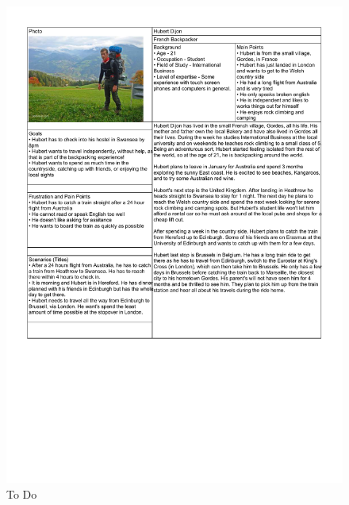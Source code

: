 \begin{figure}[h]
	\centering
	\includegraphics[scale=.8, angle=0, origin=c]{images/personaHubert}
	\caption{To Do}
	\label{fig:barbara}
\end{figure}